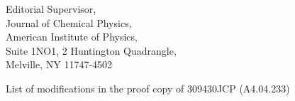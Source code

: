 
\pagestyle{empty}

\signature{K{\'a}roly N{\'e}meth}

\address{
Dr.~K{\'a}roly N{\'e}meth \\
(knemeth@lanl.gov) \\
Theoretical Division \\
Group T-12, MS B268 \\
Los Alamos National Laboratory \\
Los Alamos, NM 87545 }

\begin{letter}{
Editorial Supervisor, \\
Journal of Chemical Physics, \\
American Institute of Physics, \\
Suite 1NO1, 2 Huntington Quadrangle, \\
Melville, NY 11747-4502 }

\opening{List of modifications in the proof copy of 309430JCP (A4.04.233)}


\end{letter}
